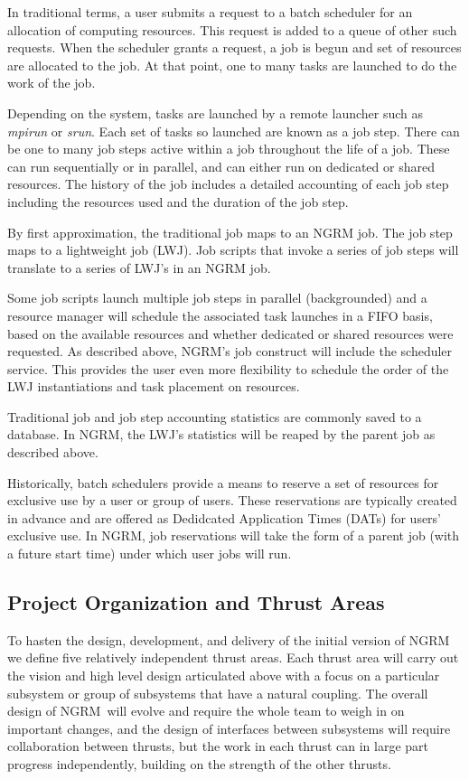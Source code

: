 \documentclass{article}
\newcommand{\ngrm}{NGRM}
\begin{document}
In traditional terms, a user submits a request to a batch scheduler
for an allocation of computing resources.  This request is added to a
queue of other such requests.  When the scheduler grants a request, a
job is begun and set of resources are allocated to the job.  At that
point, one to many tasks are launched to do the work of the job.

Depending on the system, tasks are launched by a remote launcher such
as {\em mpirun} or {\em srun}.  Each set of tasks so launched are
known as a job step.  There can be one to many job steps active within
a job throughout the life of a job.  These can run sequentially or in
parallel, and can either run on dedicated or shared resources.  The
history of the job includes a detailed accounting of each job step
including the resources used and the duration of the job step.

By first approximation, the traditional job maps to an NGRM job.  The
job step maps to a lightweight job (LWJ).  Job scripts that invoke a
series of job steps will translate to a series of LWJ's in an NGRM
job.

Some job scripts launch multiple job steps in parallel (backgrounded)
and a resource manager will schedule the associated task launches in a
FIFO basis, based on the available resources and whether dedicated or
shared resources were requested.  As described above, NGRM's job
construct will include the scheduler service.  This provides the user
even more flexibility to schedule the order of the LWJ instantiations
and task placement on resources.

Traditional job and job step accounting statistics are commonly saved
to a database.  In NGRM, the LWJ's statistics will be reaped by the
parent job as described above.

Historically, batch schedulers provide a means to reserve a set of
resources for exclusive use by a user or group of users.  These
reservations are typically created in advance and are offered as
Dedidcated Application Times (DATs) for users' exclusive use.  In
NGRM, job reservations will take the form of a parent job (with a
future start time) under which user jobs will run.

\subsection{Project Organization and Thrust Areas}
\label{sect:projorg}
To hasten the design, development, and delivery of the initial version
of \ngrm\, we define five relatively independent thrust areas.
Each thrust area will carry out the vision and high level design articulated
above with a focus on a particular subsystem or group of subsystems that
have a natural coupling.  The overall design of \ngrm\ will evolve and
require the whole team to weigh in on important changes, and the design
of interfaces between subsystems will require collaboration between
thrusts, but the work in each thrust can in large part progress
independently, building on the strength of the other thrusts.
\end{document}
